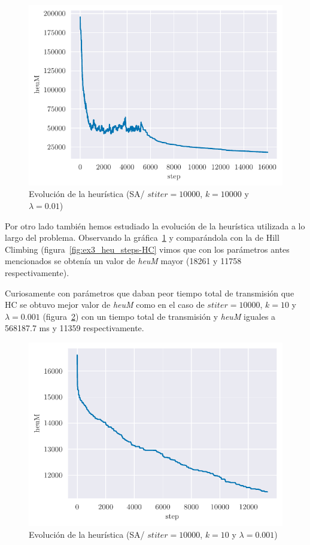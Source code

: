 \begin{figure}[H]
    \centering
    \includegraphics{include/plots/ex3_heu_steps-10000-10000-0.01.pdf}
    \caption{Evolución de la heurística (SA/ $stiter=10000$, $k=10000$ y $\lambda=0.01$)}
    \label{fig:ex3_heu_steps-10000-10000-0.01} 
\end{figure}

Por otro lado también hemos estudiado la evolución de la heurística utilizada a lo largo del problema. Observando la gráfica~\ref{fig:ex3_heu_steps-10000-10000-0.01} y comparándola con la de Hill Climbing (figura~\ref{fig:ex3_heu_steps-HC} vimos que con los parámetros antes mencionados se obtenía un valor de \emph{heuM} mayor (18261 y  11758 respectivamente).

Curiosamente con parámetros que daban peor tiempo total de transmisión que HC se obtuvo mejor valor de \emph{heuM} como en el caso de $stiter=10000$, $k=10$ y $\lambda=0.001$ (figura~\ref{fig:ex3_heu_steps-1000000-10000-10-0.001}) con un tiempo total de transmisión y \emph{heuM} iguales a 568187.7 ms y 11359 respectivamente. %

\begin{figure}[H]
    \centering
    \includegraphics{include/plots/ex3_heu_steps-1000000-10000-10-0.001.pdf}
    \caption{Evolución de la heurística (SA/ $stiter=10000$, $k=10$ y $\lambda=0.001$)}
    \label{fig:ex3_heu_steps-1000000-10000-10-0.001} 
\end{figure}

